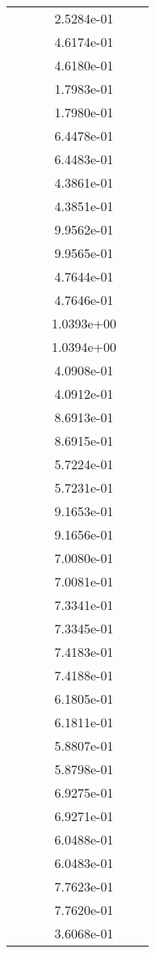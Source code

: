 \begin{xltabular}{\textwidth}{r|rS[table-format=1.3e+2]S[table-format=1.4e+2]S[table-format=1.4e+2]S[table-format=-1.5]}
&  &  & 2.5284e-01 & & \\
&  &  & 4.6174e-01 & & \\
&  &  & 4.6180e-01 & & \\
&  &  & 1.7983e-01 & & \\
&  &  & 1.7980e-01 & & \\
&  &  & 6.4478e-01 & & \\
&  &  & 6.4483e-01 & & \\
&  &  & 4.3861e-01 & & \\
&  &  & 4.3851e-01 & & \\
&  &  & 9.9562e-01 & & \\
&  &  & 9.9565e-01 & & \\
&  &  & 4.7644e-01 & & \\
&  &  & 4.7646e-01 & & \\
&  &  & 1.0393e+00 & & \\
&  &  & 1.0394e+00 & & \\
&  &  & 4.0908e-01 & & \\
&  &  & 4.0912e-01 & & \\
&  &  & 8.6913e-01 & & \\
&  &  & 8.6915e-01 & & \\
&  &  & 5.7224e-01 & & \\
&  &  & 5.7231e-01 & & \\
&  &  & 9.1653e-01 & & \\
&  &  & 9.1656e-01 & & \\
&  &  & 7.0080e-01 & & \\
&  &  & 7.0081e-01 & & \\
&  &  & 7.3341e-01 & & \\
&  &  & 7.3345e-01 & & \\
&  &  & 7.4183e-01 & & \\
&  &  & 7.4188e-01 & & \\
&  &  & 6.1805e-01 & & \\
&  &  & 6.1811e-01 & & \\
&  &  & 5.8807e-01 & & \\
&  &  & 5.8798e-01 & & \\
&  &  & 6.9275e-01 & & \\
&  &  & 6.9271e-01 & & \\
&  &  & 6.0488e-01 & & \\
&  &  & 6.0483e-01 & & \\
&  &  & 7.7623e-01 & & \\
&  &  & 7.7620e-01 & & \\
&  &  & 3.6068e-01 & & \\

\end{xltabular}

